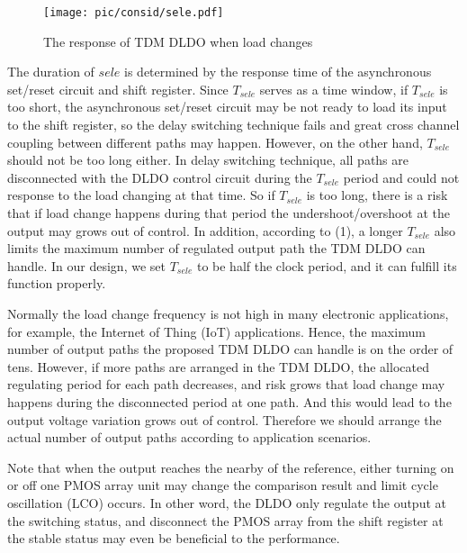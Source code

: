 \documentclass[journal]{IEEEtran}
\begin{document}
\begin{figure}[t!]
    \centering
    \texttt{[image: pic/consid/sele.pdf]}
    \caption{The response of TDM DLDO when load changes}
    \label{fig:sele}
\end{figure}
The duration of $sele$ is determined by the response time of the asynchronous set/reset circuit and shift register. Since $T_{sele}$ serves as a time window, if $T_{sele}$ is too short, the asynchronous set/reset circuit may be not ready to load its input to the shift register, so the delay switching technique fails and great cross channel coupling between different paths may happen. However, on the other hand, $T_{sele}$ should not be too long either. In delay switching technique, all paths are disconnected with the DLDO control circuit during the $T_{sele}$ period and could not response to the load changing at that time. So if $T_{sele}$ is too long, there is a risk that if load change happens during that period the undershoot/overshoot at the output may grows out of control. In addition, according to (1), a longer $T_{sele}$ also limits the maximum number of regulated output path the TDM DLDO can handle. In our design, we set $T_{sele}$ to be half the clock period, and it can fulfill its function properly.

Normally the load change frequency is not high in many electronic applications, for example, the Internet of Thing (IoT) applications. Hence, the maximum number of output paths the proposed TDM DLDO can handle is on the order of tens. However, if more paths are arranged in the TDM DLDO, the allocated regulating period for each path decreases, and risk grows that load change may happens during the disconnected period at one path. And this would lead to the output voltage variation grows out of control. Therefore we should arrange the actual number of output paths according to application scenarios.

Note that when the output reaches the nearby of the reference, either turning on or off one PMOS array unit may change the comparison result and limit cycle oscillation (LCO) occurs. In other word, the DLDO only regulate the output at the switching status, and disconnect the PMOS array from the shift register at the stable status may even be beneficial to the performance. 
\end{document}
